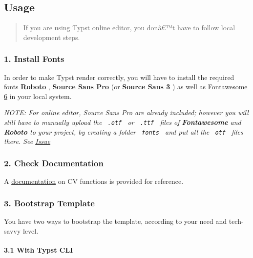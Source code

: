 \subsection{Usage}\label{usage}

\begin{quote}
If you are using Typst online editor, you donâ€™t have to follow local
development steps.
\end{quote}

\subsubsection{1. Install Fonts}\label{install-fonts}

In order to make Typst render correctly, you will have to install the
required fonts
\href{https://fonts.google.com/specimen/Roboto}{\textbf{Roboto}} ,
\href{https://fonts.google.com/specimen/Source+Sans+3}{\textbf{Source
Sans Pro}} (or \textbf{Source Sans 3} ) as well as
\href{https://fontawesome.com/download}{Fontawesome 6} in your local
system.

\emph{NOTE: For online editor, Source Sans Pro are already included;
however you will still have to manually upload the \texttt{\ .otf\ } or
\texttt{\ .ttf\ } files of \textbf{Fontawesome} and \textbf{Roboto} to
your project, by creating a folder \texttt{\ fonts\ } and put all the
\texttt{\ otf\ } files there. See
\href{https://github.com/typst/webapp-issues/issues/401}{Issue}}

\subsubsection{2. Check Documentation}\label{check-documentation}

A
\href{https://mintyfrankie.github.io/brilliant-CV/docs.pdf}{documentation}
on CV functions is provided for reference.

\subsubsection{3. Bootstrap Template}\label{bootstrap-template}

You have two ways to bootstrap the template, according to your need and
tech-savvy level.

\paragraph{3.1 With Typst CLI}\label{with-typst-cli}


